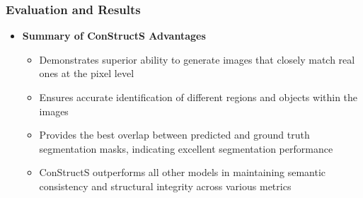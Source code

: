 \documentclass[aspectratio=169, lecture, amberg]{OTHAWbeamer}
\begin{document}
\begin{frame}
    \frametitle{Evaluation and Results}
    \begin{itemize}
        \item \textbf{Summary of ConStructS Advantages }
        \vspace{0.2cm}
        \begin{itemize}
            \item <1-> Demonstrates superior ability to generate images that closely match real ones at the pixel level
            \vspace{0.2cm}
            \item <2-> Ensures accurate identification of different regions and objects within the images
            \vspace{0.2cm}
            \item <3-> Provides the best overlap between predicted and ground truth segmentation masks, indicating excellent segmentation performance
            \vspace{0.2cm}
            \item <4-> ConStructS outperforms all other models in maintaining semantic consistency and structural integrity across various metrics
            \vspace{0.2cm}
        \end{itemize}
    \end{itemize}
    
\end{frame}
\end{document}

